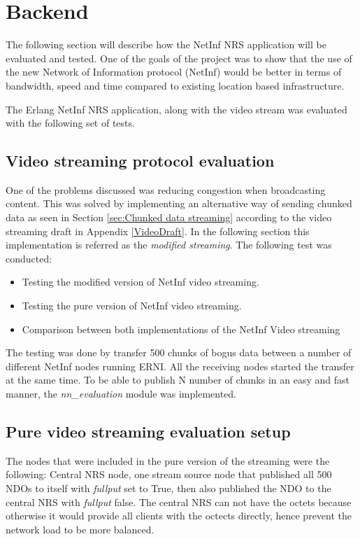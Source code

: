 \section{Backend}

The following section will describe how the NetInf NRS application will be evaluated and tested. One of the goals of the project was to show that the use of the new Network of Information protocol (NetInf) would be better in terms of bandwidth, speed and time compared to existing location based infrastructure. 

The Erlang NetInf NRS application, along with the video stream was evaluated with the following set of tests. 


\subsection{Video streaming protocol evaluation}
One of the problems discussed was reducing congestion when broadcasting content. This was solved by implementing an alternative way of sending chunked data as seen in Section \ref{sec:Chunked data streaming} according to the video streaming draft in Appendix \ref{VideoDraft}. In the following section this implementation is referred as the \textit{modified streaming}. 
The following test was conducted:

\begin{itemize}
\item Testing the modified version of NetInf video streaming. 
\item Testing the pure version of NetInf video streaming.
\item Comparison between both implementations of the NetInf Video streaming
\end{itemize}

The testing was done by transfer 500 chunks of bogus data between a number of different NetInf nodes running ERNI. All the receiving nodes started the transfer at the same time. To be able to publish N number of chunks in an easy and fast manner, the \textit{nn\_evaluation} module was implemented.


\subsection{Pure video streaming evaluation setup}
The nodes that were included in the pure version of the streaming were the following:
Central NRS node, one stream source node that published all 500 NDOs to itself with \textit{fullput} set to True, then also published the NDO to the central NRS with \textit{fullput} false. The central NRS can not have the octets because otherwise it would provide all clients with the octects directly, hence prevent the network load to be more balanced.

